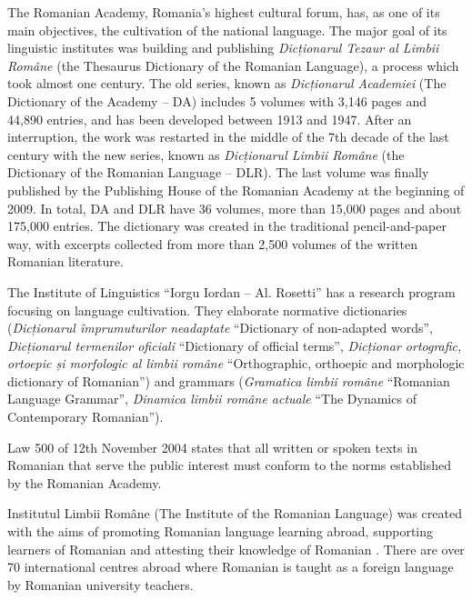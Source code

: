 \begin{multicols}{2}
The Romanian Academy, Romania’s highest cultural forum, has, as one of its main objectives, the cultivation of the national language. The major goal of its linguistic institutes was building and publishing \textit{Dicționarul Tezaur al Limbii Române} (the Thesaurus Dictionary of the Romanian Language), a process which took almost one century. The old series, known as \textit{Dicționarul Academiei} (The Dictionary of the Academy – DA) includes 5 volumes with 3,146 pages and 44,890 entries, and has been developed between 1913 and 1947. After an interruption, the work was restarted in the middle of the 7th decade of the last century with the new series, known as \textit{Dicționarul Limbii Române} (the Dictionary of the Romanian Language – DLR). The last volume was finally published by the Publishing House of the Romanian Academy at the beginning of 2009. In total, DA and DLR have 36 volumes, more than 15,000 pages and about 175,000 entries. The dictionary was created in the traditional pencil-and-paper way, with excerpts collected from more than 2,500 volumes of the written Romanian literature.

The Institute of Linguistics ``Iorgu Iordan – Al. Rosetti'' has a research program focusing on language cultivation. They elaborate normative dictionaries (\textit{Dicționarul împrumuturilor neadaptate} ``Dictionary of non-adapted words'', \textit{Dicționarul termenilor oficiali} ``Dictionary of official terms'', \textit{Dicționar ortografic, ortoepic și morfologic al limbii române} ``Orthographic, orthoepic and morphologic dictionary of Romanian'') and grammars (\textit{Gramatica limbii române} ``Romanian Language Grammar'', \textit{Dinamica limbii române actuale} ``The Dynamics of Contemporary Romanian'').

Law 500 of 12th November 2004 states that all written or spoken texts in Romanian that serve the public interest must conform to the norms established by the Romanian Academy.


Institutul Limbii Române (The Institute of the Romanian Language) was created with the aims of promoting Romanian language learning abroad, supporting learners of Romanian and attesting their knowledge of Romanian \cite{urlILR}. There are over 70 international centres abroad where Romanian is taught as a foreign language by Romanian university teachers.


\end{multicols}

